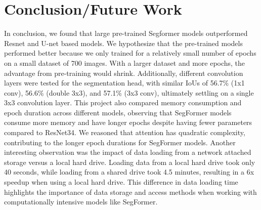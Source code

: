\documentclass[10pt,twocolumn,letterpaper]{article}
\begin{document}
\section{Conclusion/Future Work}
\label{sec:conclusion}



In conclusion, we found that large pre-trained Segformer models outperformed Resnet and U-net based models. We hypothesize that the pre-trained models performed better because we only trained for a relatively small number of epochs on a small dataset of 700 images. With a larger dataset and more epochs, the advantage from pre-training would shrink. Additionally, different convolution layers were tested for the segmentation head, with similar IoUs of 56.7\% (1x1 conv), 56.6\% (double 3x3), and 57.1\% (3x3 conv), ultimately settling on a single 3x3 convolution layer. This project also compared memory consumption and epoch duration across different models, observing that SegFormer models consume more memory and have longer epochs despite having fewer parameters compared to ResNet34. We reasoned that attention has quadratic complexity, contributing to the longer epoch durations for SegFormer models. Another interesting observation was the impact of data loading from a network attached storage versus a local hard drive. Loading data from a local hard drive took only 40 seconds, while loading from a shared drive took 4.5 minutes, resulting in a 6x speedup when using a local hard drive. This difference in data loading time highlights the importance of data storage and access methods when working with computationally intensive models like SegFormer.
\end{document}
